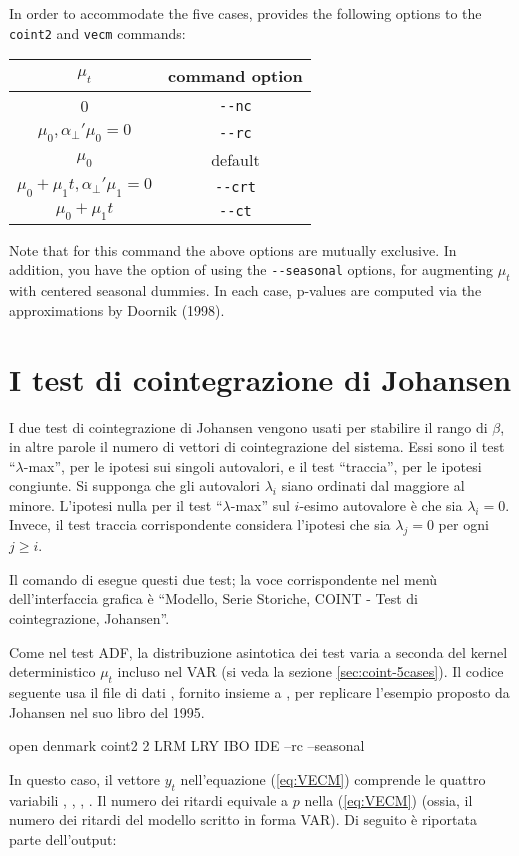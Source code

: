 In order to accommodate the five cases,  provides the
following options to the \texttt{coint2} and \texttt{vecm} commands:
\begin{center}
  \begin{tabular}{cc}
    \hline
    $\mu_t$ & command option \\
    \hline
    0 & \verb|--nc| \\
    $\mu_0, \alpha_{\perp}'\mu_0 = 0 $ &  \verb|--rc| \\
    $\mu_0$ &  default \\
    $\mu_0 + \mu_1 t , \alpha_{\perp}'\mu_1 = 0$ &  \verb|--crt| \\
    $\mu_0 + \mu_1 t$ &  \verb|--ct| \\
    \hline
  \end{tabular}
\end{center}
Note that for this command the above options are mutually exclusive.
In addition, you have the option of using the \verb|--seasonal|
options, for augmenting $\mu_t$ with centered seasonal dummies.  In
each case, p-values are computed via the approximations by Doornik
(1998).

\section{I test di cointegrazione di Johansen}
\label{sec:johansen-test}

I due test di cointegrazione di Johansen vengono usati per stabilire il
rango di $\beta$, in altre parole il numero di vettori di cointegrazione
del sistema. Essi sono il test ``$\lambda$-max'', per le ipotesi sui singoli
autovalori, e il test ``traccia'', per le ipotesi congiunte.
Si supponga che gli autovalori $\lambda_i$ siano ordinati dal maggiore al
minore. L'ipotesi nulla per il test  ``$\lambda$-max'' sul
$i$-esimo autovalore è che sia $\lambda_i = 0$. Invece, il test traccia
corrispondente considera l'ipotesi che sia $\lambda_j = 0$ per ogni
$j \ge i$.

Il comando  di  esegue questi due test; la voce
corrispondente nel menù dell'interfaccia grafica è ``Modello, Serie Storiche,
COINT - Test di cointegrazione, Johansen''.

Come nel test ADF, la distribuzione asintotica dei test varia a seconda
del kernel deterministico $\mu_t$ incluso nel VAR (si veda la sezione
\ref{sec:coint-5cases}). Il codice seguente usa il file di dati
, fornito insieme a , per replicare l'esempio proposto
da Johansen nel suo libro del 1995.
%
\begin{code}
open denmark
coint2 2 LRM LRY IBO IDE --rc --seasonal
\end{code}
%
In questo caso, il vettore $y_t$ nell'equazione (\ref{eq:VECM}) comprende le
quattro variabili , , , . Il numero dei
ritardi equivale a $p$ nella (\ref{eq:VECM}) (ossia, il numero dei ritardi del
modello scritto in forma VAR). Di seguito è riportata parte
dell'output:

